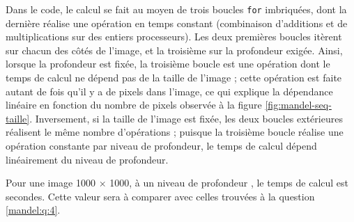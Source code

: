 Dans le code, le calcul se fait au moyen de trois boucles \texttt{for}
imbriquées, dont la dernière réalise une opération en temps constant
(combinaison d'additions et de multiplications sur des entiers
processeurs). Les deux premières boucles itèrent sur chacun des côtés
de l'image, et la troisième sur la profondeur exigée. Ainsi, lorsque
la profondeur est fixée, la troisième boucle est une opération dont le
temps de calcul ne dépend pas de la taille de l'image ; cette
opération est faite autant de fois qu'il y a de pixels dans l'image,
ce qui explique la dépendance linéaire en fonction du nombre de pixels
observée à la figure \ref{fig:mandel-seq-taille}. Inversement, si la
taille de l'image est fixée, les deux boucles extérieures réalisent le
même nombre d'opérations ; puisque la troisième boucle réalise une
opération constante par niveau de profondeur, le temps de calcul
dépend linéairement du niveau de profondeur.

Pour une image 1000 $\times$ 1000, à un niveau de profondeur
, le temps de calcul est  secondes. Cette
valeur sera à comparer avec celles trouvées à la question \ref{mandel:q:4}.

